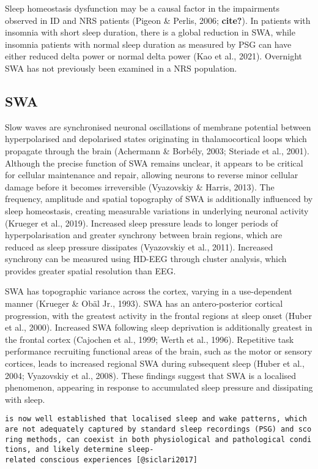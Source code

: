 \documentclass[
]{article}
\begin{document}
Sleep homeostasis dysfunction may be a causal factor in the impairments
observed in ID and NRS patients (Pigeon \& Perlis, 2006;
\textbf{cite?}). In patients with insomnia with short sleep duration,
there is a global reduction in SWA, while insomnia patients with normal
sleep duration as measured by PSG can have either reduced delta power or
normal delta power (Kao et al., 2021). Overnight SWA has not previously
been examined in a NRS population.

\subsection{SWA}\label{swa}

Slow waves are synchronised neuronal oscillations of membrane potential
between hyperpolarised and depolarised states originating in
thalamocortical loops which propagate through the brain (Achermann \&
Borbély, 2003; Steriade et al., 2001). Although the precise function of
SWA remains unclear, it appears to be critical for cellular maintenance
and repair, allowing neurons to reverse minor cellular damage before it
becomes irreversible (Vyazovskiy \& Harris, 2013). The frequency,
amplitude and spatial topography of SWA is additionally influenced by
sleep homeostasis, creating measurable variations in underlying neuronal
activity (Krueger et al., 2019). Increased sleep pressure leads to
longer periods of hyperpolarisation and greater synchrony between brain
regions, which are reduced as sleep pressure dissipates (Vyazovskiy et
al., 2011). Increased synchrony can be measured using HD-EEG through
cluster analysis, which provides greater spatial resolution than EEG.

SWA has topographic variance across the cortex, varying in a
use-dependent manner (Krueger \& Obäl Jr., 1993). SWA has an
antero-posterior cortical progression, with the greatest activity in the
frontal regions at sleep onset (Huber et al., 2000). Increased SWA
following sleep deprivation is additionally greatest in the frontal
cortex (Cajochen et al., 1999; Werth et al., 1996). Repetitive task
performance recruiting functional areas of the brain, such as the motor
or sensory cortices, leads to increased regional SWA during subsequent
sleep (Huber et al., 2004; Vyazovskiy et al., 2008). These findings
suggest that SWA is a localised phenomenon, appearing in response to
accumulated sleep pressure and dissipating with sleep.

\texttt{is\ now\ well\ established\ that\ localised\ sleep\ and\ wake\ patterns,\ which\ are\ not\ adequately\ captured\ by\ standard\ sleep\ recordings\ (PSG)\ and\ scoring\ methods,\ can\ coexist\ in\ both\ physiological\ and\ pathological\ conditions,\ and\ likely\ determine\ sleep-related\ conscious\ experiences\ {[}@siclari2017{]}}
\end{document}
